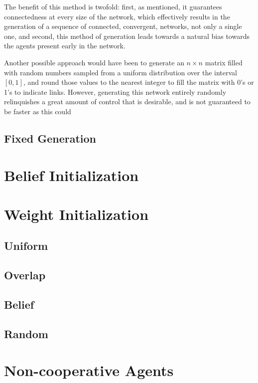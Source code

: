 \documentclass{article}
\begin{document}
The benefit of this method is twofold: first, as mentioned, it guarantees connectedness at every size of the network, which effectively results in the generation of a sequence of connected, convergent, networks, not only a single one, and second, this method of generation leads towards a natural bias towards the agents present early in the network.\newline


\newline
Another possible approach would have been to generate an $n \times n$ matrix filled with random numbers sampled from a uniform distribution over the interval $[0, 1]$, and round those values to the nearest integer to fill the matrix with 0's or 1's to indicate links. However, generating this network entirely randomly relinquishes a great amount of control that is desirable, and is not guaranteed to be faster as this could

\subsection{Fixed Generation}

\section{Belief Initialization}

\section{Weight Initialization}
\subsection{Uniform}
\subsection{Overlap}
\subsection{Belief}
\subsection{Random}

\section{Non-cooperative Agents}
\end{document}
